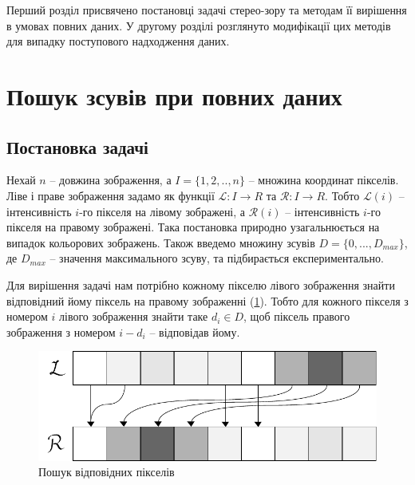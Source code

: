 \documentclass{ConfFTI}
\begin{document}
Перший розділ присвячено постановці задачі стерео-зору та методам її вирішення в умовах повних даних. У другому розділі розглянуто модифікації цих методів для випадку поступового надходження даних.


\section{Пошук зсувів при повних даних} \label{sec1}

\subsection{Постановка задачі} 
	Нехай $ n $ -- довжина зображення, а $I = \{1, 2, .., n\}$ -- множина координат пікселів. Ліве і праве зображення задамо як функції $ \mathcal{L} : I \rightarrow R $ та $ \mathcal{R} : I \rightarrow R $. Тобто $\mathcal{L}(i)$ -- інтенсивність $i$-го пікселя на лівому зображені, а $\mathcal{R}(i)$ -- інтенсивність $i$-го пікселя на правому зображені. Така постановка природно узагальнюється на випадок кольорових зображень. Також введемо множину зсувів $D = \{0, ... , D_{max}\}$, де $D_{max}$ -- значення максимального зсуву, та підбирається експериментально.

Для вирішення задачі нам потрібно кожному пікселю лівого зображення знайти відповідний йому піксель на правому зображенні (\ref{mapping}). Тобто для кожного пікселя з номером $i$ лівого зображення знайти таке $ d_i \in D$, щоб піксель правого зображення  з номером $i - d_i$ -- відповідав йому.
	
\begin{figure}[h!]
	\centering
	\includegraphics[scale = 0.5]{mapping.pdf}
	\caption{Пошук відповідних пікселів}
	\label{mapping}
\end{figure}
\end{document}
